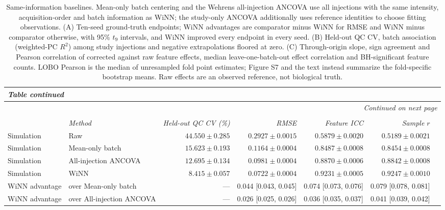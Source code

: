 \begin{landscape}
\footnotesize
\begin{longtable}{p{3.0cm}p{3.6cm}rrrrr}
\caption{Same-information baselines. Mean-only batch centering and the Wehrens all-injection ANCOVA use all injections with the same intensity, acquisition-order and batch information as WiNN; the study-only ANCOVA additionally uses reference identities to choose fitting observations. (A) Ten-seed ground-truth endpoints; WiNN advantages are comparator minus WiNN for RMSE and WiNN minus comparator otherwise, with 95\% $t_9$ intervals, and WiNN improved every endpoint in every seed. (B) Held-out QC CV, batch association (weighted-PC $R^2$) among study injections and negative extrapolations floored at zero. (C) Through-origin slope, sign agreement and Pearson correlation of corrected against raw feature effects, median leave-one-batch-out effect correlation and BH-significant feature counts. LOBO Pearson is the median of unresampled fold point estimates; Figure S7 and the text instead summarize the fold-specific bootstrap means. Raw effects are an observed reference, not biological truth.}\label{tab:supp_baselines}\\
\toprule
\endfirsthead
\multicolumn{7}{l}{\textit{Table \thetable{} continued}}\\
\toprule
\endhead
\midrule
\multicolumn{7}{r}{\textit{Continued on next page}}\\
\endfoot
\bottomrule
\endlastfoot
\multicolumn{7}{l}{\textbf{A. Simulation truth (ten seeds; mean $\pm$ SE)}} \\
 & \textit{Method} & \textit{Held-out QC CV (\%)} & \textit{RMSE} & \textit{Feature ICC} & \textit{Sample $r$} &  \\
\midrule
Simulation & Raw & $44.550 \pm 0.285$ & $0.2927 \pm 0.0015$ & $0.5879 \pm 0.0020$ & $0.5189 \pm 0.0021$ &  \\
Simulation & Mean-only batch & $15.623 \pm 0.193$ & $0.1164 \pm 0.0004$ & $0.8487 \pm 0.0008$ & $0.8454 \pm 0.0008$ &  \\
Simulation & All-injection ANCOVA & $12.695 \pm 0.134$ & $0.0981 \pm 0.0004$ & $0.8870 \pm 0.0006$ & $0.8842 \pm 0.0008$ &  \\
Simulation & WiNN & $8.415 \pm 0.057$ & $0.0722 \pm 0.0004$ & $0.9231 \pm 0.0005$ & $0.9247 \pm 0.0010$ &  \\
WiNN advantage & over Mean-only batch & --- & 0.044 [0.043, 0.045] & 0.074 [0.073, 0.076] & 0.079 [0.078, 0.081] &  \\
WiNN advantage & over All-injection ANCOVA & --- & 0.026 [0.025, 0.026] & 0.036 [0.035, 0.037] & 0.041 [0.039, 0.042] &  \\

\end{longtable}
\end{landscape}
